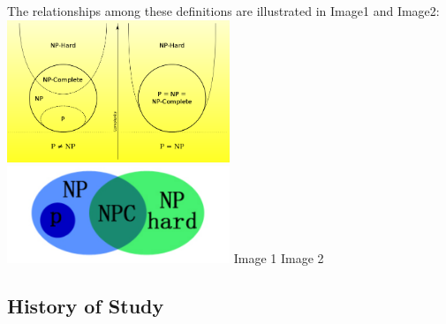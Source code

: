\documentclass[acmsmall]{acmart}
\begin{document}
	The relationships among these definitions are illustrated in Image1 and Image2:\\
	
	\includegraphics[width=0.5\textwidth]{1.png}
	\includegraphics[width=0.5\textwidth]{2.png}
	\hspace*{9em} Image 1 \hspace*{17em} Image 2
	
	\subsection{History of Study}
	
\end{document}
